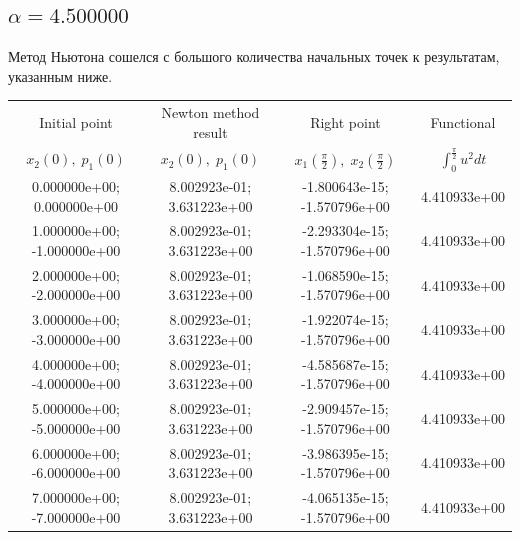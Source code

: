 \documentclass[titlepage]{article}
\def\l{\left}
\def\r{\right}
\begin{document}
\subsection{$\alpha = 4.500000$} 
Метод Ньютона сошелся с большого количества начальных точек к результатам, указанным ниже. \\ 
\begin{tabular}{ | c | c | c | c |} 
\hline 
Initial point  & Newton method result & Right point & Functional 
 \\ $x_2(0), \; p_1(0)$ & $x_2(0), \; p_1(0)$ & $x_1\l(\frac{\pi}{2}\r), \; x_2\l(\frac{\pi}{2}\r)$ & $\int_{0}^{\frac{\pi}{2}}u^2dt$  \\ \hline 
0.000000e+00; 0.000000e+00 & 8.002923e-01; 3.631223e+00 & -1.800643e-15; -1.570796e+00 & 4.410933e+00 \\ \hline 
1.000000e+00; -1.000000e+00 & 8.002923e-01; 3.631223e+00 & -2.293304e-15; -1.570796e+00 & 4.410933e+00 \\ \hline 
2.000000e+00; -2.000000e+00 & 8.002923e-01; 3.631223e+00 & -1.068590e-15; -1.570796e+00 & 4.410933e+00 \\ \hline 
3.000000e+00; -3.000000e+00 & 8.002923e-01; 3.631223e+00 & -1.922074e-15; -1.570796e+00 & 4.410933e+00 \\ \hline 
4.000000e+00; -4.000000e+00 & 8.002923e-01; 3.631223e+00 & -4.585687e-15; -1.570796e+00 & 4.410933e+00 \\ \hline 
5.000000e+00; -5.000000e+00 & 8.002923e-01; 3.631223e+00 & -2.909457e-15; -1.570796e+00 & 4.410933e+00 \\ \hline 
6.000000e+00; -6.000000e+00 & 8.002923e-01; 3.631223e+00 & -3.986395e-15; -1.570796e+00 & 4.410933e+00 \\ \hline 
7.000000e+00; -7.000000e+00 & 8.002923e-01; 3.631223e+00 & -4.065135e-15; -1.570796e+00 & 4.410933e+00 \\ \hline 
\end{tabular} 
\end{document}
